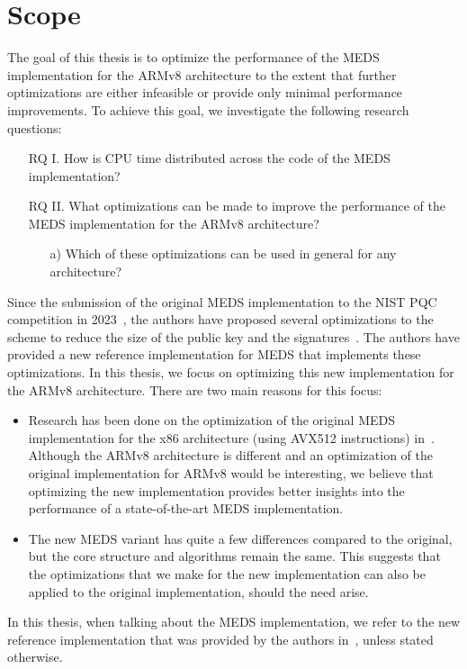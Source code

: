 \documentclass[11pt,a4paper]{report}
\theoremstyle{definition}
\begin{document}
\section{Scope}
The goal of this thesis is to optimize the performance of the MEDS implementation for the ARMv8 architecture to the extent that further optimizations are either infeasible or provide only minimal performance improvements. To achieve this goal, we investigate the following research questions:
\begin{itemize}[left=35pt,labelsep=15pt]
  \item[RQ I.] How is CPU time distributed across the code of the MEDS implementation?
        \pagebreak
  \item[RQ II.] What optimizations can be made to improve the performance of the MEDS implementation for the ARMv8 architecture?
        \begin{itemize}
          \item[a)] Which of these optimizations can be used in general for any
                architecture?
        \end{itemize}
\end{itemize}

Since the submission of the original MEDS implementation to the NIST PQC competition in 2023~\cite{chou2023meds}, the authors have proposed several optimizations to the scheme to reduce the size of the public key and the signatures~\cite{chou2024reducing}. The authors have provided a new reference implementation for MEDS that implements these optimizations. In this thesis, we focus on optimizing this new implementation for the ARMv8 architecture. There are two main reasons for this focus:
\begin{itemize}
  \item Research has been done on the optimization of the original MEDS implementation for the x86 architecture (using AVX512 instructions) in~\cite{IIS2023HighLevel, IIS2023LowLevel}. Although the ARMv8 architecture is different and an optimization of the original implementation for ARMv8 would be interesting, we believe that optimizing the new implementation provides better insights into the performance of a state-of-the-art MEDS implementation.
  \item The new MEDS variant has quite a few differences compared to the original, but the core structure and algorithms remain the same. This suggests that the optimizations that we make for the new implementation can also be applied to the original implementation, should the need arise.
\end{itemize}
In this thesis, when talking about the MEDS implementation, we refer to the new reference implementation that was provided by the authors in~\cite{chou2024reducing}, unless stated otherwise.
\end{document}
